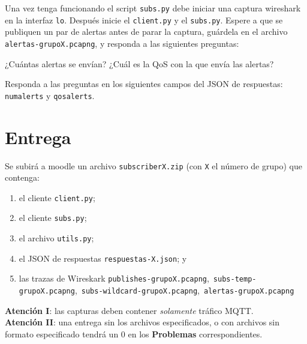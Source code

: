 \documentclass{upmassignment}
\begin{document}
Una vez tenga funcionando el script
\texttt{subs.py} debe iniciar una captura
wireshark en la interfaz \texttt{lo}.
Después inicie el \texttt{client.py}
y el \texttt{subs.py}. Espere a que se
publiquen un par de alertas antes de parar
la captura, guárdela en el archivo
\texttt{alertas-grupoX.pcapng}, y responda
a las siguientes preguntas:
\begin{problemlist}
    \pbitem ¿Cuántas alertas se envían?
    \pbitem ¿Cuál es la QoS con la que envía
        las alertas?
\end{problemlist}
Responda a las preguntas en los
siguientes campos del JSON de respuestas:
\texttt{numalerts} y
\texttt{qosalerts}.




\section*{Entrega}
\noindent Se subirá a moodle un archivo
\texttt{subscriberX.zip}
(con \texttt{X} el número de grupo)
que contenga:
\begin{enumerate}
    \item el cliente \texttt{client.py};
    \item el cliente \texttt{subs.py};
    \item el archivo \texttt{utils.py};
    \item el JSON de respuestas \texttt{respuestas-X.json}; y
    \item las trazas de Wireskark
        \texttt{publishes-grupoX.pcapng},\
        \texttt{subs-temp-grupoX.pcapng},\
        \texttt{subs-wildcard-grupoX.pcapng},\
        \texttt{alertas-grupoX.pcapng}
\end{enumerate}

\begin{tcolorbox}
    \textbf{Atención I}: las capturas
    deben contener
    \emph{solamente} tráfico MQTT.\\
    \textbf{Atención II}: una entrega
    sin los archivos especificados,
    o con archivos sin formato especificado
    tendrá un 0 en los \textbf{Problemas}
    correspondientes.
\end{tcolorbox}
\end{document}
